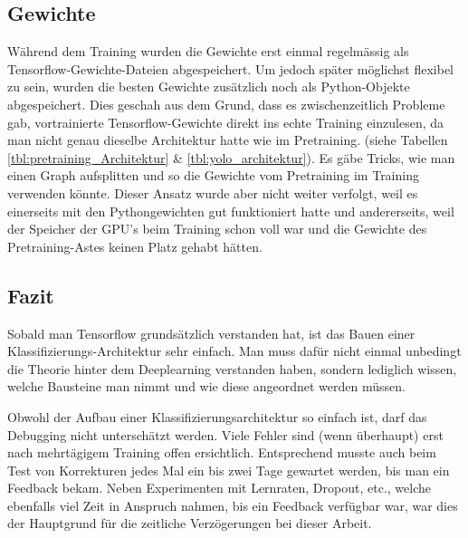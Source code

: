 \subsection{Gewichte}
Während dem Training wurden die Gewichte erst einmal regelmässig als Tensorflow-Gewichte-Dateien abgespeichert.
Um jedoch später möglichst flexibel zu sein, wurden die besten Gewichte zusätzlich noch als Python-Objekte abgespeichert.
Dies geschah aus dem Grund, dass es zwischenzeitlich Probleme gab, vortrainierte Tensorflow-Gewichte direkt ins echte Training einzulesen, da man nicht genau dieselbe Architektur hatte wie im Pretraining. (siehe Tabellen \ref{tbl:pretraining_Architektur} \& \ref{tbl:yolo_architektur}).
Es gäbe Tricks, wie man einen Graph aufsplitten und so die Gewichte vom Pretraining im Training verwenden könnte. 
Dieser Ansatz wurde aber nicht weiter verfolgt, weil es einerseits mit den Pythongewichten gut funktioniert hatte und andererseits, weil der Speicher der GPU's beim Training schon voll war und die Gewichte des Pretraining-Astes keinen Platz gehabt hätten.

\subsection{Fazit}
Sobald man Tensorflow grundsätzlich verstanden hat, ist das Bauen einer Klassifizierungs-Architektur sehr einfach. 
Man muss dafür nicht einmal unbedingt die Theorie hinter dem Deeplearning verstanden haben, sondern lediglich wissen, welche Bausteine \grqq{}man\grqq{} nimmt und wie diese angeordnet werden müssen.

Obwohl der Aufbau einer Klassifizierungsarchitektur so einfach ist, darf das Debugging nicht unterschätzt werden.
Viele Fehler sind (wenn überhaupt) erst nach mehrtägigem Training offen ersichtlich.
Entsprechend musste auch beim Test von Korrekturen jedes Mal ein bis zwei Tage gewartet werden, bis man ein Feedback bekam.
Neben Experimenten mit Lernraten, Dropout, etc., welche ebenfalls viel Zeit in Anspruch nahmen, bis ein Feedback verfügbar war, war dies der Hauptgrund für die zeitliche Verzögerungen bei dieser Arbeit.